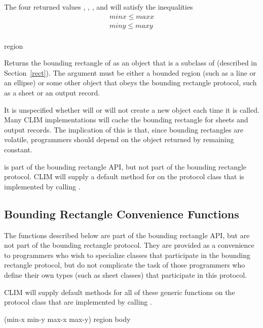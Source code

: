 The four returned values , , , and 
will satisfy the inequalities
\begin{eqnarray*}
  minx \leq maxx \\
  miny \leq maxy \\
\end{eqnarray*}


 {region}

Returns the bounding rectangle of  as an object that is a subclass
of  (described in Section~\ref{rect}).  The argument 
must be either a bounded region (such as a line or an ellipse) or some other
object that obeys the bounding rectangle protocol, such as a sheet or an output
record.

It is unspecified whether  will or will not create a new
object each time it is called.  Many CLIM implementations will cache the
bounding rectangle for sheets and output records.  The implication of this is
that, since bounding rectangles are volatile, programmers should depend on the
object returned by  remaining constant.

 is part of the bounding rectangle API, but not part of
the bounding rectangle protocol.  CLIM will supply a default method for
 on the protocol class  that is
implemented by calling .


\subsection {Bounding Rectangle Convenience Functions}

The functions described below are part of the bounding rectangle API, but are
not part of the bounding rectangle protocol.  They are provided as a convenience
to programmers who wish to specialize classes that participate in the bounding
rectangle protocol, but do not complicate the task of those programmers who
define their own types (such as sheet classes) that participate in this
protocol.

CLIM will supply default methods for all of these generic functions on the
protocol class  that are implemented by calling
.


 {(min-x min-y max-x max-y) region \body body}  

